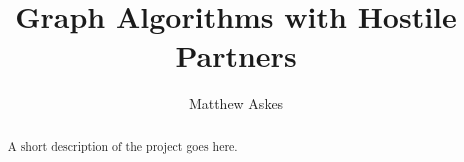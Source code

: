 \documentclass[11pt
              , a4paper
              , twoside
              , openright
              ]{report}
\title{Graph Algorithms with Hostile Partners}
\author{Matthew Askes}
\date{}
\theoremstyle{definition}
\begin{document}
\frontmatter



\begin{abstract}

A short description of the project goes here.

\end{abstract}


\maketitle

%

\tableofcontents



\mainmatter


%
%
%
%





\backmatter



%


\end{document}
